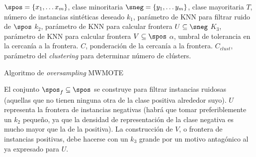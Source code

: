 \begin{algorithm}[H]
\begin{algorithmic}[1]
  \REQUIRE $\spos = \{x_1, \ldots x_m\}$, clase minoritaria
  \REQUIRE $\sneg = \{y_1, \ldots y_m\}$, clase mayoritaria
  \REQUIRE $T$, número de instancias sintéticas deseado
  \REQUIRE $k_{1}$, parámetro de KNN para filtrar ruido de $\spos$
  \REQUIRE $k_{2}$, parámetro de KNN para calcular frontera $U \subseteq \sneg$
  \REQUIRE $K_{3}$, parámetro de KNN para calcular frontera $V \subseteq \spos$
  \REQUIRE $\alpha$, umbral de tolerancia en la cercanía a la frontera.
  \REQUIRE $C$, ponderación de la cercanía a la frontera.
  \REQUIRE $C_{clust}$, parámetro del \textit{clustering} para determinar número de clústers.
  \NEWLINE
  \ENDFOR
  \NEWLINE
\end{algorithmic}
\caption{Algoritmo de \textit{oversampling} MWMOTE}
\label{alg:mwmote}
\end{algorithm}


El conjunto $\spos_f \subseteq \spos$ se construye para filtrar instancias ruidosas (aquellas que no tienen ninguna otra 
de la clase positiva alrededor suyo). $U$ representa la frontera de instancias negativas (habrá que tomar preferiblemente
un $k_2$ pequeño, ya que la densidad de representación de la clase negativa es mucho mayor que la de la positiva). La 
construcción de $V$, o frontera de instancias positivas, debe hacerse con un $k_3$ grande por un motivo antagónico al 
ya expresado para $U$.

